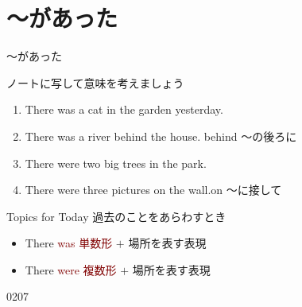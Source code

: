 \documentclass[aspectratio=169,xcolor={dvipsnames,table}]{beamer}
\newcommand{\myaudio}[1]{\href{#1}{\faVolumeUp}}
\begin{document}
\section{～があった}
\begin{frame}[plain]{〜があった}

ノートに写して意味を考えましょう
\begin{enumerate}
 \item There was a cat in the garden yesterday.
 \item There was a river behind the house.%
\hfill{\scriptsize behind ～の後ろに }
 \item There were two big trees in the park.
 \item There were three pictures on the wall.\hfill{\scriptsize on ～に接して}
\end{enumerate}

\begin{block}{Topics for Today}
過去のことをあらわすとき
\begin{itemize}[square]
 \item There \textcolor{Maroon}{was 単数形} $+$ 場所を表す表現
 \item There \textcolor{Maroon}{were 複数形} $+$ 場所を表す表現
\end{itemize}
\end{block}

\hfill{\tiny 0207}\,{\scriptsize \myaudio{./audio/001_there_is_04.mp3}}
\end{frame}
\end{document}
